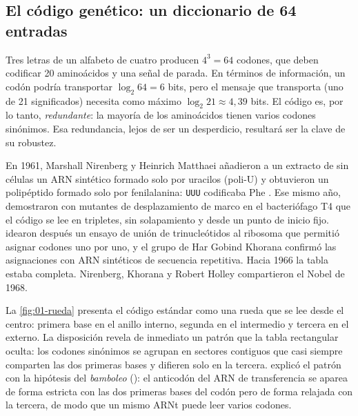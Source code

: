 \subsection{El código genético: un diccionario de 64 entradas}

Tres letras de un alfabeto de cuatro producen $4^3=64$ codones, que deben codificar 20 aminoácidos y una señal de parada. En términos de información, un codón podría transportar $\log_2 64 = 6$ bits, pero el mensaje que transporta (uno de 21 significados) necesita como máximo $\log_2 21\approx 4{,}39$ bits. El código es, por lo tanto, \emph{redundante}: la mayoría de los aminoácidos tienen varios codones sinónimos. Esa redundancia, lejos de ser un desperdicio, resultará ser la clave de su robustez.

\begin{historia}
En 1961, Marshall Nirenberg y Heinrich Matthaei añadieron a un extracto de  sin células un ARN sintético formado solo por uracilos (poli-U) y obtuvieron un polipéptido formado solo por fenilalanina: \texttt{UUU} codificaba Phe \parencite{c01-nirenberg1961}. Ese mismo año, \textcite{c01-crick1961} demostraron con mutantes de desplazamiento de marco en el bacteriófago T4 que el código se lee en tripletes, sin solapamiento y desde un punto de inicio fijo. \textcite{c01-nirenberg1964} idearon después un ensayo de unión de trinucleótidos al ribosoma que permitió asignar codones uno por uno, y el grupo de Har Gobind Khorana confirmó las asignaciones con ARN sintéticos de secuencia repetitiva. Hacia 1966 la tabla estaba completa. Nirenberg, Khorana y Robert Holley compartieron el Nobel de 1968.
\end{historia}

La \cref{fig:01-rueda} presenta el código estándar como una rueda que se lee desde el centro: primera base en el anillo interno, segunda en el intermedio y tercera en el externo. La disposición revela de inmediato un patrón que la tabla rectangular oculta: los codones sinónimos se agrupan en sectores contiguos que casi siempre comparten las dos primeras bases y difieren solo en la tercera. \textcite{c01-crick1966} explicó el patrón con la hipótesis del \emph{bamboleo} (): el anticodón del ARN de transferencia se aparea de forma estricta con las dos primeras bases del codón pero de forma relajada con la tercera, de modo que un mismo ARNt puede leer varios codones.

